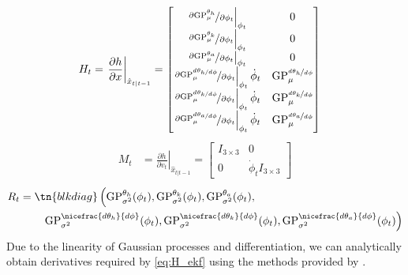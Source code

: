 \begin{align}
    H_t &= \left. \frac{\partial h}{\partial x} \right|_{\hat{x}_{t|t-1}}
        = \begin{bmatrix} 
        \left. \nicefrac{\partial \mathrm{GP}_\mu^{\theta_h}}{\partial \phi_t}
            \right|_{\phi_t} & 0 \\
        \left. \nicefrac{\partial \mathrm{GP}_\mu^{\theta_k}}{\partial \phi_t}
            \right|_{\phi_t} & 0 \\
        \left. \nicefrac{\partial \mathrm{GP}_\mu^{\theta_a}}{\partial \phi_t}
            \right|_{\phi_t} & 0 \\
        \left. \nicefrac{\partial 
            \mathrm{GP}_\mu^{\nicefrac{d \theta_h}{d \phi}}}
            {\partial \phi_t} \right|_{\phi_t} \dot{\phi}_t & 
            \mathrm{GP}_\mu^{\nicefrac{d \theta_h}{d \phi}} \\
        \left. \nicefrac{\partial 
            \mathrm{GP}_\mu^{\nicefrac{d \theta_k}{d \phi}}}
            {\partial \phi_t} \right|_{\phi_t} \dot{\phi}_t & 
            \mathrm{GP}_\mu^{\nicefrac{d \theta_k}{d \phi}} \\
        \left. \nicefrac{\partial 
            \mathrm{GP}_\mu^{\nicefrac{d \theta_a}{d \phi}}}
            {\partial \phi_t} \right|_{\phi_t} \dot{\phi}_t & 
            \mathrm{GP}_\mu^{\nicefrac{d \theta_a}{d \phi}}
        \end{bmatrix} \label{eq:H_ekf}
\end{align}
\begin{align}
    M_t &= \left. \frac{\partial h}{\partial v_t} \right|_{\hat{x}_{t|t-1}} 
        = \begin{bmatrix}
        I_{3 \times 3} & 0 \\ 0 & \dot{\phi}_t I_{3 \times 3}
        \end{bmatrix}
\end{align}
\begin{align}
    \begin{split}
    R_t &= \tn{blkdiag} \left(\mathrm{GP}_{\sigma^2}^{\theta_h}(\phi_t),
        \mathrm{GP}_{\sigma^2}^{\theta_k}(\phi_t), 
        \mathrm{GP}_{\sigma^2}^{\theta_a}(\phi_t), \right. \\
        & \qquad \left. \mathrm{GP}_{\sigma^2}^{\nicefrac{d \theta_h}{d\phi}}
            (\phi_t),
        \mathrm{GP}_{\sigma^2}^{\nicefrac{d \theta_k}{d\phi}}(\phi_t),
        \mathrm{GP}_{\sigma^2}^{\nicefrac{d \theta_a}{d\phi}}(\phi_t) \right)
    \end{split}
\end{align}
Due to the linearity of Gaussian processes and differentiation, we can
analytically obtain derivatives required by \cref{eq:H_ekf} using the methods
provided by \citet{solak2003derivative}. 

